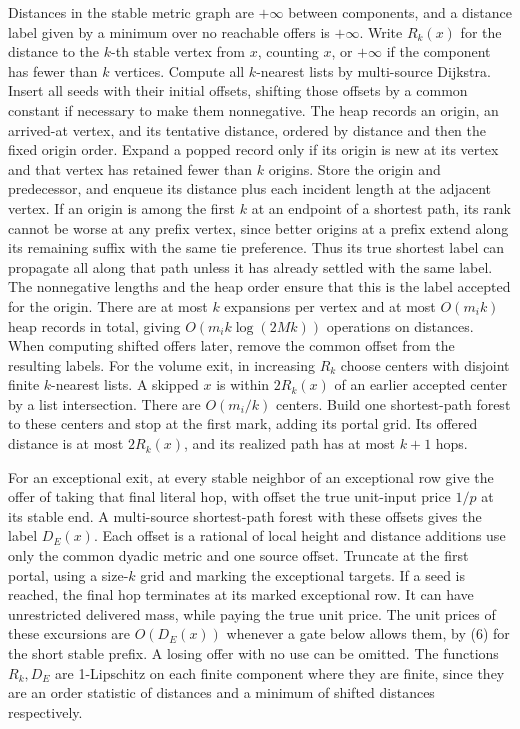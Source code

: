 \documentclass[11pt]{article}
\begin{document}
Distances in the stable metric graph are \(+\infty\) between components, and a distance label given by a minimum over no reachable offers is \(+\infty\). Write \(R_k(x)\) for the distance to the \(k\)-th stable vertex from \(x\), counting \(x\), or \(+\infty\) if the component has fewer than \(k\) vertices. Compute all \(k\)-nearest lists by multi-source Dijkstra. Insert all seeds with their initial offsets, shifting those offsets by a common constant if necessary to make them nonnegative. The heap records an origin, an arrived-at vertex, and its tentative distance, ordered by distance and then the fixed origin order. Expand a popped record only if its origin is new at its vertex and that vertex has retained fewer than \(k\) origins. Store the origin and predecessor, and enqueue its distance plus each incident length at the adjacent vertex. If an origin is among the first \(k\) at an endpoint of a shortest path, its rank cannot be worse at any prefix vertex, since better origins at a prefix extend along its remaining suffix with the same tie preference. Thus its true shortest label can propagate all along that path unless it has already settled with the same label. The nonnegative lengths and the heap order ensure that this is the label accepted for the origin. There are at most \(k\) expansions per vertex and at most \(O(m_i k)\) heap records in total, giving \(O(m_i k\log(2Mk))\) operations on distances. When computing shifted offers later, remove the common offset from the resulting labels. For the volume exit, in increasing \(R_k\) choose centers with disjoint finite \(k\)-nearest lists. A skipped \(x\) is within \(2R_k(x)\) of an earlier accepted center by a list intersection. There are \(O(m_i/k)\) centers. Build one shortest-path forest to these centers and stop at the first mark, adding its portal grid. Its offered distance is at most \(2R_k(x)\), and its realized path has at most \(k+1\) hops.

For an exceptional exit, at every stable neighbor of an exceptional row give the offer of taking that final literal hop, with offset the true unit-input price \(1/p\) at its stable end. A multi-source shortest-path forest with these offsets gives the label \(D_E(x)\). Each offset is a rational of local height and distance additions use only the common dyadic metric and one source offset. Truncate at the first portal, using a size-\(k\) grid and marking the exceptional targets. If a seed is reached, the final hop terminates at its marked exceptional row. It can have unrestricted delivered mass, while paying the true unit price. The unit prices of these excursions are \(O(D_E(x))\) whenever a gate below allows them, by (6) for the short stable prefix. A losing offer with no use can be omitted. The functions \(R_k,D_E\) are 1-Lipschitz on each finite component where they are finite, since they are an order statistic of distances and a minimum of shifted distances respectively.
\end{document}
